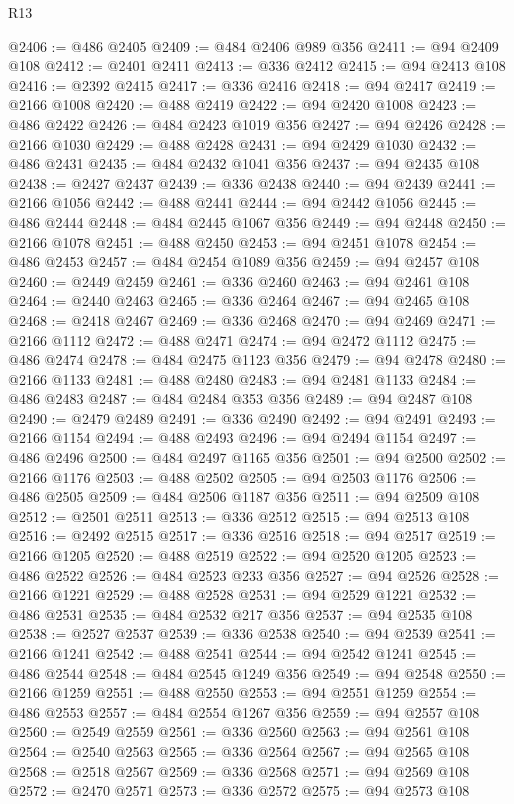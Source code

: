 \begin{lexlean}{R13}
\begin{coremodule}
@2406 := @486 @2405
@2409 := @484 @2406 @989 @356
@2411 := @94 @2409 @108
@2412 := @2401 @2411
@2413 := @336 @2412
@2415 := @94 @2413 @108
@2416 := @2392 @2415
@2417 := @336 @2416
@2418 := @94 @2417
@2419 := @2166 @1008
@2420 := @488 @2419
@2422 := @94 @2420 @1008
@2423 := @486 @2422
@2426 := @484 @2423 @1019 @356
@2427 := @94 @2426
@2428 := @2166 @1030
@2429 := @488 @2428
@2431 := @94 @2429 @1030
@2432 := @486 @2431
@2435 := @484 @2432 @1041 @356
@2437 := @94 @2435 @108
@2438 := @2427 @2437
@2439 := @336 @2438
@2440 := @94 @2439
@2441 := @2166 @1056
@2442 := @488 @2441
@2444 := @94 @2442 @1056
@2445 := @486 @2444
@2448 := @484 @2445 @1067 @356
@2449 := @94 @2448
@2450 := @2166 @1078
@2451 := @488 @2450
@2453 := @94 @2451 @1078
@2454 := @486 @2453
@2457 := @484 @2454 @1089 @356
@2459 := @94 @2457 @108
@2460 := @2449 @2459
@2461 := @336 @2460
@2463 := @94 @2461 @108
@2464 := @2440 @2463
@2465 := @336 @2464
@2467 := @94 @2465 @108
@2468 := @2418 @2467
@2469 := @336 @2468
@2470 := @94 @2469
@2471 := @2166 @1112
@2472 := @488 @2471
@2474 := @94 @2472 @1112
@2475 := @486 @2474
@2478 := @484 @2475 @1123 @356
@2479 := @94 @2478
@2480 := @2166 @1133
@2481 := @488 @2480
@2483 := @94 @2481 @1133
@2484 := @486 @2483
@2487 := @484 @2484 @353 @356
@2489 := @94 @2487 @108
@2490 := @2479 @2489
@2491 := @336 @2490
@2492 := @94 @2491
@2493 := @2166 @1154
@2494 := @488 @2493
@2496 := @94 @2494 @1154
@2497 := @486 @2496
@2500 := @484 @2497 @1165 @356
@2501 := @94 @2500
@2502 := @2166 @1176
@2503 := @488 @2502
@2505 := @94 @2503 @1176
@2506 := @486 @2505
@2509 := @484 @2506 @1187 @356
@2511 := @94 @2509 @108
@2512 := @2501 @2511
@2513 := @336 @2512
@2515 := @94 @2513 @108
@2516 := @2492 @2515
@2517 := @336 @2516
@2518 := @94 @2517
@2519 := @2166 @1205
@2520 := @488 @2519
@2522 := @94 @2520 @1205
@2523 := @486 @2522
@2526 := @484 @2523 @233 @356
@2527 := @94 @2526
@2528 := @2166 @1221
@2529 := @488 @2528
@2531 := @94 @2529 @1221
@2532 := @486 @2531
@2535 := @484 @2532 @217 @356
@2537 := @94 @2535 @108
@2538 := @2527 @2537
@2539 := @336 @2538
@2540 := @94 @2539
@2541 := @2166 @1241
@2542 := @488 @2541
@2544 := @94 @2542 @1241
@2545 := @486 @2544
@2548 := @484 @2545 @1249 @356
@2549 := @94 @2548
@2550 := @2166 @1259
@2551 := @488 @2550
@2553 := @94 @2551 @1259
@2554 := @486 @2553
@2557 := @484 @2554 @1267 @356
@2559 := @94 @2557 @108
@2560 := @2549 @2559
@2561 := @336 @2560
@2563 := @94 @2561 @108
@2564 := @2540 @2563
@2565 := @336 @2564
@2567 := @94 @2565 @108
@2568 := @2518 @2567
@2569 := @336 @2568
@2571 := @94 @2569 @108
@2572 := @2470 @2571
@2573 := @336 @2572
@2575 := @94 @2573 @108

\end{coremodule}
\end{lexlean}
